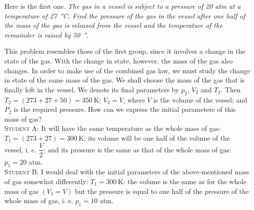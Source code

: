\documentclass[a4paper,sfsidenotes]{tufte-book}
\begin{document}
Here is the first one. \emph{The gas in a vessel is subject to a pressure of 20 atm at a temperature of \SI{27}{\degree}C. Find the pressure of the gas in the vessel after one half of the mass of the gas is released from the vessel and the temperature of the remainder is raised by \SI{50}{\degree}.}

This problem resembles those of the first group, since it involves a change in the state of the gas. With the change in state, however, the mass of the gas also changes. In order to make use of the combined gas law, we must study the change in state of the same mass of the gas. We shall choose the mass of the gas that is finally left in the vessel. We denote its final parameters by $p_{2},\, V_{2}$ and $T_{2}$. Then $T_{2}=(273+27+50)= \SI{350}{\kelvin}$; $V_{2}=V$, where $V$ is the volume of the vessel; and $P_{2}$ is the required pressure. How can we express the initial parameters of this mass of gas?
\\
\textsc{Student A:} It will have the same temperature as the whole mass of gas: $T_{1}= (273+27)=\SI{300}{\kelvin}$; its volume will be one half of the volume of the vessel, i. e. $\dfrac{V}{2}$; and its pressure is the same as that of the whole mass of gas: $p_{1} =20$ atm.
\\
\textsc{Student B:} I would deal with the initial parameters of the above-mentioned mass of gas somewhat differently: $T_{1}=\SI{300}{\kelvin}$: the volume is the same as for the whole mass of gas $(V_{1}=V)$ but the pressure is equal to one half of the pressure of the whole mass of gas, i. e. $p_{1} =10$ atm.
\\
\end{document}
